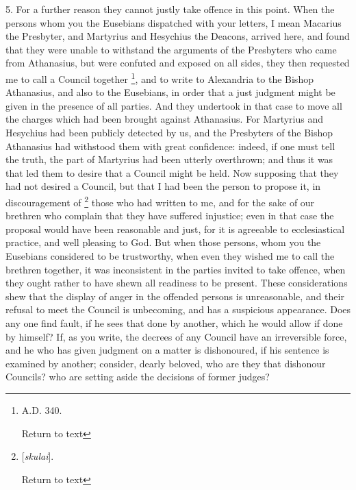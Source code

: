 5. For a further reason they cannot justly take
offence in this point. When the persons whom you the Eusebians
dispatched with your letters, I mean Macarius the Presbyter, and
Martyrius and Hesychius the Deacons, arrived here, and found that they
were unable to withstand the arguments of the Presbyters who came from
Athanasius, but were confuted and exposed on all sides, they then
requested me to call a Council together \footnote{A.D.
340.

Return to text}, and to write to Alexandria to the Bishop Athanasius, and also
to the Eusebians, in order that a just judgment might be given in the
presence of all parties. And they undertook in that case to move all
the charges which had been brought against Athanasius. For Martyrius
and Hesychius had been publicly detected by us, and the Presbyters of
the Bishop Athanasius had withstood them with great confidence:
indeed, if one must tell the truth, the part of Martyrius had been
utterly overthrown; and thus it was that led them to desire that a
Council might be held. Now supposing that they had not desired a
Council, but that I had been the person to propose it, in
discouragement of \footnote{[\emph{skulai}].

Return to text}
those who had written to me, and for the sake of our brethren who
complain that they have suffered injustice; even in that case the
proposal would have been reasonable and just, for it is agreeable to
ecclesiastical practice, and well pleasing to God. But when those
persons, whom you the Eusebians considered to be trustworthy, when
even they wished me to call the brethren together, it was inconsistent
in the parties invited to take offence, when they ought rather to have
shewn all readiness to be present. These considerations shew that the
display of anger in the offended persons is unreasonable, and their
refusal to meet the Council is unbecoming, and has a suspicious
appearance. Does any one find fault, if he sees that done by another,
which he would allow if done by himself? If, as you write, the decrees
of any Council have an irreversible force, and he who has given
judgment on a matter is dishonoured, if his sentence is examined by
another; consider, dearly beloved, who are they that dishonour
Councils? who are setting aside the decisions of former judges?

